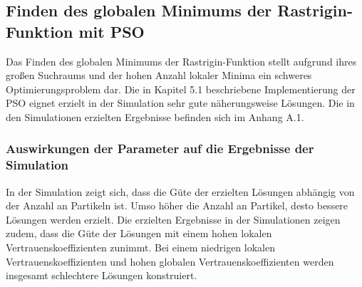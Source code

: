 \documentclass[a4paper, 11pt]{article}
\begin{document}
\subsection{Finden des globalen Minimums der Rastrigin-Funktion mit \acs{PSO}}
Das Finden des globalen Minimums der Rastrigin-Funktion stellt aufgrund ihres großen Suchraums und der hohen Anzahl lokaler Minima ein schweres Optimierungsproblem dar. Die in Kapitel 5.1 beschriebene Implementierung der \acs{PSO} eignet erzielt in der Simulation sehr gute näherungsweise Lösungen. Die in den Simulationen erzielten Ergebnisse befinden sich im Anhang A.1.
\subsubsection{Auswirkungen der Parameter auf die Ergebnisse der Simulation}
In der Simulation zeigt sich, dass die Güte der erzielten Lösungen abhängig von der Anzahl an Partikeln ist. Umso höher die Anzahl an Partikel, desto bessere Lösungen werden erzielt.
Die erzielten Ergebnisse in der Simulationen zeigen zudem, dass die Güte der Lösungen mit einem hohen lokalen Vertrauenskoeffizienten zunimmt. Bei einem niedrigen lokalen Vertrauenskoeffizienten und hohen globalen Vertrauenskoeffizienten werden insgesamt schlechtere Lösungen konstruiert.
\end{document}
